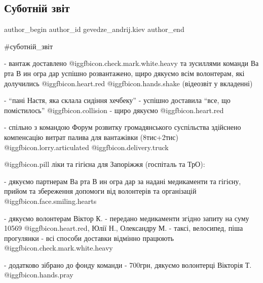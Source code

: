 
 
 
 
 
 
\subsection{Суботній звіт}
\label{sec:01_05_2022.fb.gevedze_andrij.kiev.1.subotnij_zvit}
 
\ifcmt
 author_begin
   author_id gevedze_andrij.kiev
 author_end
\fi


\#суботній\_звіт

- вантаж доставлено  @igg{fbicon.check.mark.white.heavy}  та зусиллями команди Ва рта В ин огра дар успішно
розвантажено, щиро дякуємо всім волонтерам, які долучились @igg{fbicon.heart.red} @igg{fbicon.hands.shake}  (відеозвіт у
вкладенні)

- \enquote{пані Настя, яка склала сидіння хечбеку} - успішно доставила \enquote{все, що
помістилось}  @igg{fbicon.collision} - щиро дякуємо @igg{fbicon.heart.red}

- спільно з командою Форум розвитку громадянського суспільства здійснено
компенсацію витрат палива для вантажівки (8тис+2тис)  @igg{fbicon.lorry.articulated}  @igg{fbicon.delivery.truck} 

 @igg{fbicon.pill}  ліки та гігієна для Запоріжжя (госпіталь та ТрО): 

- дякуємо партнерам Ва рта В ин огра дар за надані медикаменти та гігієну,
прийом та збереження допомоги від волонтерів та організацій  @igg{fbicon.face.smiling.hearts} 

- дякуємо волонтерам Віктор К. - передано медикаменти згідно запиту на суму
10569 @igg{fbicon.heart.red}, Юлії Н., Олександру М. - таксі, велосипед, піша прогулянки - всі
способи доставки відмінно працюють  @igg{fbicon.check.mark.white.heavy} 

- додатково зібрано до фонду команди - 700грн, дякуємо волонтерці Вікторія Т.
 @igg{fbicon.hands.pray} 

